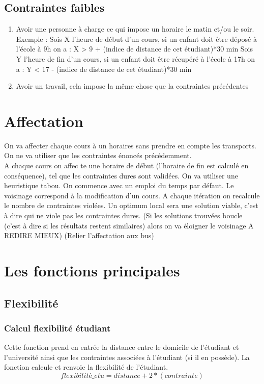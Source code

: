 \documentclass[a4paper,11pt]{article}
\begin{document}
	\subsection{Contraintes faibles}
		\begin{enumerate}
			\item Avoir une personne à charge ce qui impose un horaire le matin et/ou le soir.
			Exemple : Sois X l'heure de début d'un cours, si un enfant doit être déposé à l'école à 9h on a : X > 9 + (indice de distance de cet étudiant)*30 min
			Sois Y l'heure de fin d'un cours, si un enfant doit être récupéré à l'école à 17h on a : Y < 17 - (indice de distance de cet étudiant)*30 min
			\item Avoir un travail, cela impose la même chose que la contraintes précédentes
		\end{enumerate}
\section{Affectation}
	On va affecter chaque cours à un horaires sans prendre en compte les transports. On ne va utiliser que les contraintes énoncés précédemment. \\
	A chaque cours on affec		te une horaire de début (l'horaire de fin est calculé en conséquence), tel que les contraintes dures sont validées.
	On va utiliser une heuristique tabou. On commence avec un emploi du temps par défaut. Le voisinage correspond à la modification d'un cours. A chaque itération on recalcule le nombre de contraintes violées. Un optimum local sera une solution viable, c'est à dire qui ne viole pas les contraintes dures.
	(Si les solutions trouvées boucle (c'est à dire si les résultats restent similaires) alors on va éloigner le voisinage A REDIRE MIEUX)
	(Relier l'affectation aux bus)	
	
\section{Les fonctions principales}
	\subsection{Flexibilité}
		\subsubsection{Calcul flexibilité étudiant}
		Cette fonction prend en entrée la distance entre le domicile de l'étudiant et l'université ainsi que les contraintes
		associées à l'étudiant (si il en possède). La fonction calcule et renvoie la flexibilité de l'étudiant.
		$$flexibilité\_etu  = distance + 2*(contrainte)$$
\end{document}
